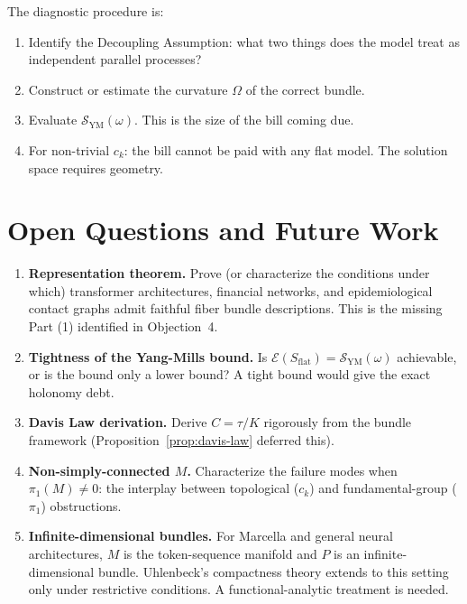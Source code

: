 \documentclass[12pt]{amsart}
\theoremstyle{plain}
\theoremstyle{definition}
\begin{document}
The diagnostic procedure is:
\begin{enumerate}[label=\arabic*.]
  \item Identify the Decoupling Assumption: what two things does the model
    treat as independent parallel processes?
  \item Construct or estimate the curvature $\Omega$ of the correct bundle.
  \item Evaluate $\mathcal{S}_{\mathrm{YM}}(\omega)$. This is the size of
    the bill coming due.
  \item For non-trivial $c_k$: the bill cannot be paid with any flat model.
    The solution space requires geometry.
\end{enumerate}

\section{Open Questions and Future Work}
\label{sec:open}

\begin{enumerate}
  \item \textbf{Representation theorem.} Prove (or characterize the
    conditions under which) transformer architectures, financial networks,
    and epidemiological contact graphs admit faithful fiber bundle
    descriptions. This is the missing Part (1) identified in Objection~4.

  \item \textbf{Tightness of the Yang-Mills bound.} Is
    $\mathcal{E}(S_{\mathrm{flat}}) = \mathcal{S}_{\mathrm{YM}}(\omega)$
    achievable, or is the bound only a lower bound? A tight bound would give
    the exact holonomy debt.

  \item \textbf{Davis Law derivation.} Derive $C = \tau/K$ rigorously from
    the bundle framework (Proposition~\ref{prop:davis-law} deferred this).

  \item \textbf{Non-simply-connected $M$.} Characterize the failure modes
    when $\pi_1(M) \neq 0$: the interplay between topological ($c_k$) and
    fundamental-group ($\pi_1$) obstructions.

  \item \textbf{Infinite-dimensional bundles.} For Marcella and general
    neural architectures, $M$ is the token-sequence manifold and $P$ is an
    infinite-dimensional bundle. Uhlenbeck's compactness theory extends to
    this setting only under restrictive conditions. A functional-analytic
    treatment is needed.
\end{enumerate}
\end{document}
